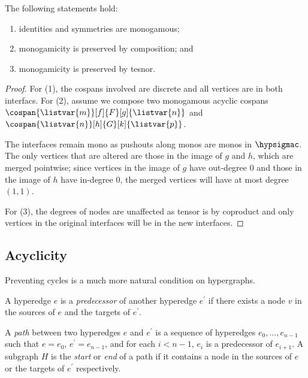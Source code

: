 \begin{lemma}
    \label{lem:monogamicity-preserved}
    The following statements hold:
    \begin{enumerate}
        \item identities and symmetries are monogamous;
        \item monogamicity is preserved by composition; and
        \item monogamicity is preserved by tesnor.
    \end{enumerate}
\end{lemma}
\begin{proof}
    For (1), the cospans involved are discrete and all vertices are in both
    interfacs.
    For (2), assume we compose two monogamous acyclic cospans \(
        \cospan{\listvar{m}}[f]{F}[g]{\listvar{n}}
    \) and \(
        \cospan{\listvar{n}}[h]{G}[k]{\listvar{p}}
    \).

    The interfaces remain mono as pushouts along monos are monos in
    \(\hypsigmac\). The only vertices that are altered are those in the image of
    \(g\) and \(h\), which are merged pointwise; since vertices in the image of
    \(g\) have out-degree \(0\) and those in the image of \(h\) have in-degree
    \(0\), the merged vertices will have at most degree \((1, 1)\).

    For (3), the degrees of nodes are unaffected as tensor is by coproduct and
    only vertices in the original interfaces will be in the new interfaces.
\end{proof}

\subsection{Acyclicity}

Preventing cycles is a much more natural condition on hypergraphs.

\begin{definition}
    A hyperedge \(e\) is a \emph{predecessor} of another hyperedge \(e^\prime\)
    if there exists a node \(v\) in the sources of \(e\) and the targets of
    \(e^\prime\).
\end{definition}

\begin{definition}
    A \emph{path} between two hyperedges \(e\) and \(e^\prime\) is a sequence of
    hyperedges \(e_0, \dots, e_{n-1}\) such that \(e = e_0\),
    \(e^\prime = e_{n-1}\), and for each \(i < n-1\), \(e_i\) is a predecessor
    of \(e_{i+1}\).
    A subgraph \(H\) is the \emph{start} or \emph{end} of a path if it contains
    a node in the sources of \(e\) or the targets of \(e^\prime\) respectively.
\end{definition}


